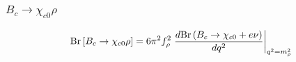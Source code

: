 \documentclass{beamer}
\begin{document}
\begin{frame}
  \frametitle{$B_c \to \chi_{c0} \rho$}
  $$
  \mathrm{Br}\left[B_c \to \chi_{c0} \rho\right] =
  6\pi^2 f_\rho^2 \left.
    \frac{d\mathrm{Br}\left(B_c\to\chi_{c0}+e\nu\right)}{dq^2}
  \right|_{q^2=m_\rho^2}
  $$
  \begin{columns}
    \begin{column}{0.5\textwidth}
      \vspace{3mm}
      
    \end{column}
  \begin{column}{0.5\textwidth}
      \\
      \vspace{3mm}
      
       \end{column}
\end{columns}
\end{frame}
\end{document}
